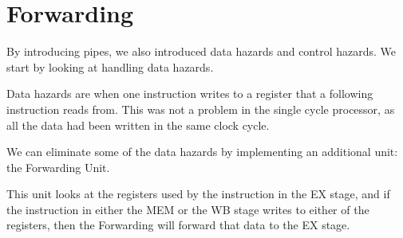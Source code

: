 \documentclass{beamer}
\begin{document}
\section{Forwarding}
\begin{frame}
    By introducing pipes, we also introduced data hazards and control hazards.
    We start by looking at handling data hazards.

    \vspace{\baselineskip}
    Data hazards are when one instruction writes to a register that a following
    instruction reads from. This was not a problem in the single cycle
    processor, as all the data had been written in the same clock cycle.
\end{frame}
\begin{frame}
    We can eliminate some of the data hazards by implementing an additional
    unit: the Forwarding Unit.

    \vspace{\baselineskip}
    This unit looks at the registers used by the instruction in the EX stage,
    and if the instruction in either the MEM or the WB stage writes to either
    of the registers, then the Forwarding will forward that data to the EX
    stage.
\end{frame}
\end{document}

